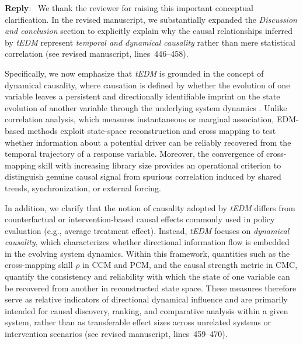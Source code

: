 \documentclass[11pt]{article}
\newcounter{reviewer}
\newenvironment{reply}
   {\medskip \noindent \color{blue} \begin{sf}\textbf{Reply}:\  }
   {\medskip \par \end{sf}}
\begin{document}
\begin{reply}
We thank the reviewer for raising this important conceptual clarification. In the revised manuscript, we substantially expanded the \emph{Discussion and conclusion} section to explicitly explain why the causal relationships inferred by \textit{tEDM} represent \emph{temporal and dynamical causality} rather than mere statistical correlation (see revised manuscript, lines~446--458).

Specifically, we now emphasize that \textit{tEDM} is grounded in the concept of dynamical causality, where causation is defined by whether the evolution of one variable leaves a persistent and directionally identifiable imprint on the state evolution of another variable through the underlying system dynamics \citep{sugihara2012ccm,leng2020pcm,tao2023cmc,gao2023gccm}. Unlike correlation analysis, which measures instantaneous or marginal association, EDM-based methods exploit state-space reconstruction and cross mapping to test whether information about a potential driver can be reliably recovered from the temporal trajectory of a response variable. Moreover, the convergence of cross-mapping skill with increasing library size provides an operational criterion to distinguish genuine causal signal from spurious correlation induced by shared trends, synchronization, or external forcing.

In addition, we clarify that the notion of causality adopted by \textit{tEDM} differs from counterfactual or intervention-based causal effects commonly used in policy evaluation (e.g., average treatment effect). Instead, \textit{tEDM} focuses on \emph{dynamical causality}, which characterizes whether directional information flow is embedded in the evolving system dynamics. Within this framework, quantities such as the cross-mapping skill $\rho$ in CCM and PCM, and the causal strength metric in CMC, quantify the consistency and reliability with which the state of one variable can be recovered from another in reconstructed state space. These measures therefore serve as relative indicators of directional dynamical influence and are primarily intended for causal discovery, ranking, and comparative analysis within a given system, rather than as transferable effect sizes across unrelated systems or intervention scenarios (see revised manuscript, lines~459--470).


\end{reply}
\end{document}
